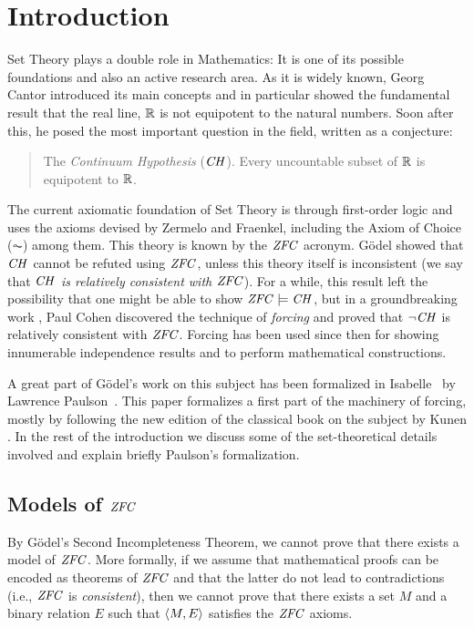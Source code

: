 \section{Introduction}\label{sec:introduction}
Set Theory plays a double role in Mathematics: It is one of its
possible foundations and also an active research area.
%
As it is widely known, Georg Cantor introduced its main concepts and in
particular showed the fundamental result that the real line, $\mathbb{R}$  is not
equipotent to the natural numbers. Soon after this, he posed the
most important question in the field, written as a conjecture:
\begin{quote}
  The \emph{Continuum Hypothesis} ($\mathit{CH}$). Every uncountable subset of $\mathbb{R}$ is
  equipotent to $\mathbb{R}$.
\end{quote}

The current axiomatic foundation of Set Theory is through first-order
logic and uses the axioms devised by Zermelo and Fraenkel, including
the Axiom of Choice ($\AC$) among them. This theory is known by the
$\mathit{ZFC}$ acronym. G\"odel \cite{godel-L} showed that $\mathit{CH}$ cannot be refuted using
$\mathit{ZFC}$, unless this theory itself is inconsistent (we say that
\emph{$\mathit{CH}$ is relatively consistent with $\mathit{ZFC}$}). For a while, this
result left the possibility that one might be able to show
$\mathit{ZFC}\models \mathit{CH}$, but in a groundbreaking work \cite{Cohen-CH-PNAS},
Paul Cohen discovered the technique of \emph{forcing} and proved that
$\neg\mathit{CH}$ is relatively consistent with $\mathit{ZFC}$. Forcing has been used
since then for showing innumerable independence results and to perform
mathematical constructions.

A great part of G\"odel's work on this subject has been formalized in
Isabelle~\cite{Isabelle} by Lawrence Paulson~\cite{paulson_2003}. This paper formalizes
a first part of the machinery of forcing, mostly by following the new
edition of the classical book on the subject by Kunen \cite{kunen2011set}. In the rest of the
introduction we discuss some of the set-theoretical details involved
and explain briefly Paulson's formalization.

\subsection{Models of $\mathit{ZFC}$}
By G\"odel's Second Incompleteness Theorem, we cannot  prove that
there exists a model of $\mathit{ZFC}$. More formally, if we assume that
mathematical proofs can be encoded as theorems of $\mathit{ZFC}$ and that
the latter do not lead to contradictions (i.e., $\mathit{ZFC}$ is
\emph{consistent}), then we cannot prove that there exists a set $M$
and a binary relation $E$ such that $\langle M,E\rangle$ satisfies the $\mathit{ZFC}$
axioms.

